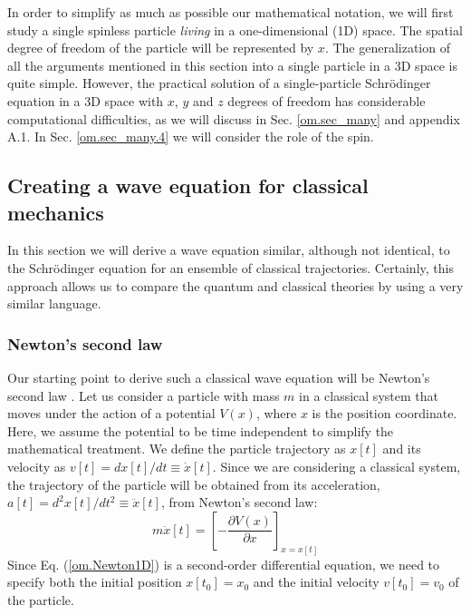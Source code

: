 \documentclass[nofootinbib, secnumarabic, amsmath, nobibnotes,10pt,aps,pra]{revtex4-1}
\newcommand{\sref}[1]{Sec. \ref{#1}}
\newcommand{\eref}[1]{Eq. (\ref{#1})}
\begin{document}
In order to simplify as much as possible our mathematical notation,
we will first study a single spinless particle \textit{living} in a
one-dimensional (1D) space. The spatial  degree of freedom of the particle will be represented by $x$. The generalization
of all the arguments mentioned in this section into a single
particle in a 3D space is quite simple. However, the practical
solution of a single-particle Schr\"odinger equation in a 3D space with $x$, $y$ and $z$ degrees of freedom has considerable computational difficulties, as we will discuss in
\sref{om.sec_many}
and appendix A.1. In \sref{om.sec_many.4} we will consider the
role of the spin.

\subsection{Creating a wave equation for classical mechanics}\label{om.sec.single_2}

In this section we will derive a wave equation similar, although not
identical, to the Schr\"odinger equation for an ensemble of
classical trajectories. Certainly, this approach allows us to
compare the quantum and classical theories by using a very similar
language.

\subsubsection{Newton's second law}

Our starting point to derive such a classical wave equation will be
Newton's second law \cite{om.Feynmann1963}. Let us consider a particle with
mass $m$ in a classical system that moves under the action of a
potential $V(x)$, where $x$ is the position coordinate. Here, we
assume the potential to be time independent to simplify the
mathematical treatment. We define the particle trajectory as $x[t]$
and its velocity as $v[t] = dx[t]/dt\equiv\dot{x}[t]$. Since we are
considering a classical system, the trajectory of the particle will
be obtained from its acceleration, $a[t] =
d^2x[t]/dt^2\equiv\ddot{x}[t]$, from Newton's second law:
\begin{equation} \label{om.Newton1D}
m \ddot{x}[t] = \left [-\frac{\partial V(x)}{\partial x} \right ] _{x = x[t]}
\end{equation}
Since \eref{om.Newton1D} is a second-order differential equation, we need to specify both the initial position $x[t_0] = x_0$ and the initial velocity $v[t_0] = v_0$ of the particle.
\end{document}
